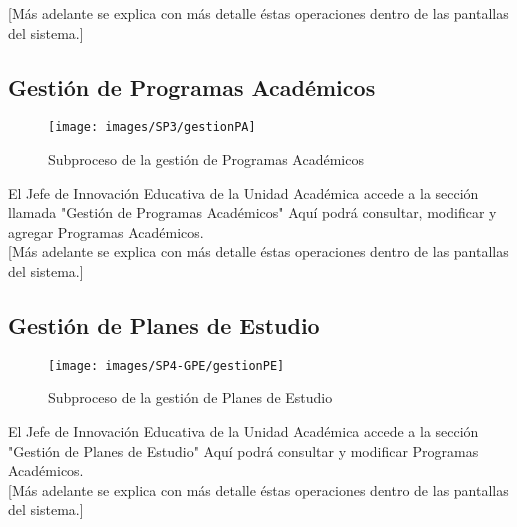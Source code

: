         [Más adelante se explica con más detalle éstas operaciones dentro de las pantallas del sistema.]\\
        \newpage
        \subsection{Gestión de Programas Académicos}

        \begin{figure}[!hbtp]
            \centering
            \hypertarget{BPMNGPA}{\texttt{[image: images/SP3/gestionPA]}}
            \caption{Subproceso de la gestión de Programas Académicos}
            \label{BPMNGPA}
        \end{figure}

        El Jefe de Innovación Educativa de la Unidad Académica accede a la sección llamada "Gestión de Programas Académicos" Aquí podrá consultar, modificar y agregar Programas Académicos. \\

        [Más adelante se explica con más detalle éstas operaciones dentro de las pantallas del sistema.]\\
        \newpage
        \subsection{Gestión de Planes de Estudio}

        \begin{figure}[!hbtp]
        	\centering
        	\hypertarget{BPMNGPE}{\texttt{[image: images/SP4-GPE/gestionPE]}}
        	\caption{Subproceso de la gestión de Planes de Estudio}
        	\label{BPMNGPE}
        \end{figure}

        El Jefe de Innovación Educativa de la Unidad Académica accede a la sección "Gestión de Planes de Estudio" Aquí podrá consultar y modificar Programas Académicos. \\

        [Más adelante se explica con más detalle éstas operaciones dentro de las pantallas del sistema.]\\